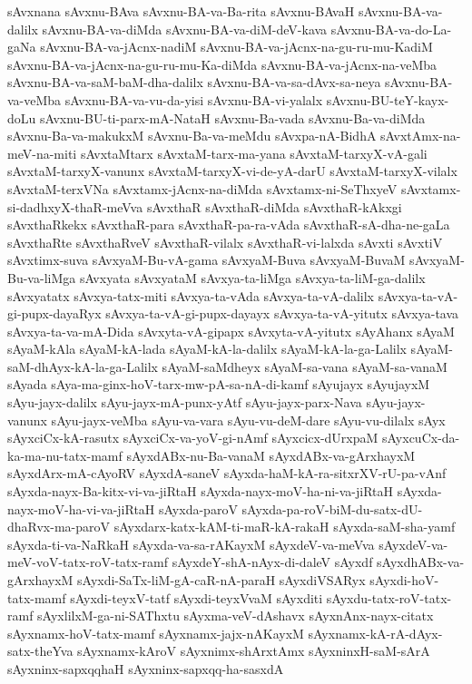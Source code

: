 {sAvxnana
sAvxnu-BAva
sAvxnu-BA-va-Ba-rita
sAvxnu-BAvaH
sAvxnu-BA-va-dalilx
sAvxnu-BA-va-diMda
sAvxnu-BA-va-diM-deV-kava
sAvxnu-BA-va-do-La-gaNa
sAvxnu-BA-va-jAcnx-nadiM
sAvxnu-BA-va-jAcnx-na-gu-ru-mu-KadiM
sAvxnu-BA-va-jAcnx-na-gu-ru-mu-Ka-diMda
sAvxnu-BA-va-jAcnx-na-veMba
sAvxnu-BA-va-saM-baM-dha-dalilx
sAvxnu-BA-va-sa-dAvx-sa-neya
sAvxnu-BA-va-veMba
sAvxnu-BA-va-vu-da-yisi
sAvxnu-BA-vi-yalalx
sAvxnu-BU-teY-kayx-doLu
sAvxnu-BU-ti-parx-mA-NataH
sAvxnu-Ba-vada
sAvxnu-Ba-va-diMda
sAvxnu-Ba-va-makukxM
sAvxnu-Ba-va-meMdu
sAvxpa-nA-BidhA
sAvxtAmx-na-meV-na-miti
sAvxtaMtarx
sAvxtaM-tarx-ma-yana
sAvxtaM-tarxyX-vA-gali
sAvxtaM-tarxyX-vanunx
sAvxtaM-tarxyX-vi-de-yA-darU
sAvxtaM-tarxyX-vilalx
sAvxtaM-terxVNa
sAvxtamx-jAcnx-na-diMda
sAvxtamx-ni-SeThxyeV
sAvxtamx-si-dadhxyX-thaR-meVva
sAvxthaR
sAvxthaR-diMda
sAvxthaR-kAkxgi
sAvxthaRkekx
sAvxthaR-para
sAvxthaR-pa-ra-vAda
sAvxthaR-sA-dha-ne-gaLa
sAvxthaRte
sAvxthaRveV
sAvxthaR-vilalx
sAvxthaR-vi-lalxda
sAvxti
sAvxtiV
sAvxtimx-suva
sAvxyaM-Bu-vA-gama
sAvxyaM-Buva
sAvxyaM-BuvaM
sAvxyaM-Bu-va-liMga
sAvxyata
sAvxyataM
sAvxya-ta-liMga
sAvxya-ta-liM-ga-dalilx
sAvxyatatx
sAvxya-tatx-miti
sAvxya-ta-vAda
sAvxya-ta-vA-dalilx
sAvxya-ta-vA-gi-pupx-dayaRyx
sAvxya-ta-vA-gi-pupx-dayayx
sAvxya-ta-vA-yitutx
sAvxya-tava
sAvxya-ta-va-mA-Dida
sAvxyta-vA-gipapx
sAvxyta-vA-yitutx
sAyAhanx
sAyaM
sAyaM-kAla
sAyaM-kA-lada
sAyaM-kA-la-dalilx
sAyaM-kA-la-ga-Lalilx
sAyaM-saM-dhAyx-kA-la-ga-Lalilx
sAyaM-saMdheyx
sAyaM-sa-vana
sAyaM-sa-vanaM
sAyada
sAya-ma-ginx-hoV-tarx-mw-pA-sa-nA-di-kamf
sAyujayx
sAyujayxM
sAyu-jayx-dalilx
sAyu-jayx-mA-punx-yAtf
sAyu-jayx-parx-Nava
sAyu-jayx-vanunx
sAyu-jayx-veMba
sAyu-va-vara
sAyu-vu-deM-dare
sAyu-vu-dilalx
sAyx
sAyxciCx-kA-rasutx
sAyxciCx-va-yoV-gi-nAmf
sAyxcicx-dUrxpaM
sAyxcuCx-da-ka-ma-nu-tatx-mamf
sAyxdABx-nu-Ba-vanaM
sAyxdABx-va-gArxhayxM
sAyxdArx-mA-cAyoRV
sAyxdA-saneV
sAyxda-haM-kA-ra-sitxrXV-rU-pa-vAnf
sAyxda-nayx-Ba-kitx-vi-va-jiRtaH
sAyxda-nayx-moV-ha-ni-va-jiRtaH
sAyxda-nayx-moV-ha-vi-va-jiRtaH
sAyxda-paroV
sAyxda-pa-roV-biM-du-satx-dU-dhaRvx-ma-paroV
sAyxdarx-katx-kAM-ti-maR-kA-rakaH
sAyxda-saM-sha-yamf
sAyxda-ti-va-NaRkaH
sAyxda-va-sa-rAKayxM
sAyxdeV-va-meVva
sAyxdeV-va-meV-voV-tatx-roV-tatx-ramf
sAyxdeY-shA-nAyx-di-daleV
sAyxdf
sAyxdhABx-va-gArxhayxM
sAyxdi-SaTx-liM-gA-caR-nA-paraH
sAyxdiVSARyx
sAyxdi-hoV-tatx-mamf
sAyxdi-teyxV-tatf
sAyxdi-teyxVvaM
sAyxditi
sAyxdu-tatx-roV-tatx-ramf
sAyxlilxM-ga-ni-SAThxtu
sAyxma-veV-dAshavx
sAyxnAnx-nayx-citatx
sAyxnamx-hoV-tatx-mamf
sAyxnamx-jajx-nAKayxM
sAyxnamx-kA-rA-dAyx-satx-theYva
sAyxnamx-kAroV
sAyxnimx-shArxtAmx
sAyxninxH-saM-sArA
sAyxninx-sapxqqhaH
sAyxninx-sapxqq-ha-sasxdA
}

